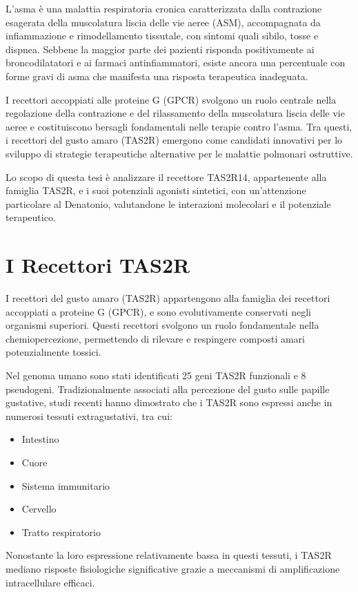 \documentclass[12pt, a4paper]{book}
\begin{document}
L'asma è una malattia respiratoria cronica caratterizzata dalla contrazione esagerata della muscolatura liscia delle vie aeree (ASM), accompagnata da infiammazione e rimodellamento tissutale, con sintomi quali sibilo, tosse e dispnea. Sebbene la maggior parte dei pazienti risponda positivamente ai broncodilatatori e ai farmaci antinfiammatori, esiste ancora una percentuale con forme gravi di asma che manifesta una risposta terapeutica inadeguata.

I recettori accoppiati alle proteine G (GPCR) svolgono un ruolo centrale nella regolazione della contrazione e del rilassamento della muscolatura liscia delle vie aeree e costituiscono bersagli fondamentali nelle terapie contro l’asma. Tra questi, i recettori del gusto amaro (TAS2R) emergono come candidati innovativi per lo sviluppo di strategie terapeutiche alternative per le malattie polmonari ostruttive.

Lo scopo di questa tesi è analizzare il recettore TAS2R14, appartenente alla famiglia TAS2R, e i suoi potenziali agonisti sintetici, con un’attenzione particolare al Denatonio, valutandone le interazioni molecolari e il potenziale terapeutico.
\newpage
\chapter{I Recettori TAS2R}

I recettori del gusto amaro (TAS2R) appartengono alla famiglia dei recettori accoppiati a proteine G (GPCR), e sono evolutivamente conservati negli organismi superiori. Questi recettori svolgono un ruolo fondamentale nella chemiopercezione, permettendo di rilevare e respingere composti amari potenzialmente tossici.

Nel genoma umano sono stati identificati 25 geni TAS2R funzionali e 8 pseudogeni. Tradizionalmente associati alla percezione del gusto sulle papille gustative, studi recenti hanno dimostrato che i TAS2R sono espressi anche in numerosi tessuti extragustativi, tra cui:
\begin{itemize}
    \item Intestino
    \item Cuore
    \item Sistema immunitario
    \item Cervello
    \item Tratto respiratorio
\end{itemize}

Nonostante la loro espressione relativamente bassa in questi tessuti, i TAS2R mediano risposte fisiologiche significative grazie a meccanismi di amplificazione intracellulare efficaci.
\end{document}
